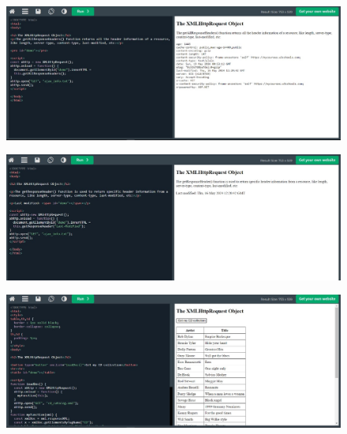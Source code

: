 \documentclass{article}
\begin{document}
\begin{itemize}
\begin{figure}[H]
		\end{figure}
		\begin{figure}[H]
			\centering
			\includegraphics[width=1.0\textwidth,keepaspectratio]{img/L12.jpg}
		\end{figure}
		\begin{figure}[H]
			\centering
			\includegraphics[width=1.0\textwidth,keepaspectratio]{img/L13.jpg}
		\end{figure}
		\begin{figure}[H]
			\centering
			\includegraphics[width=1.0\textwidth,keepaspectratio]{img/L14.jpg}
		\end{figure}
		\begin{figure}[H]

\end{figure}
\end{itemize}
\end{document}

